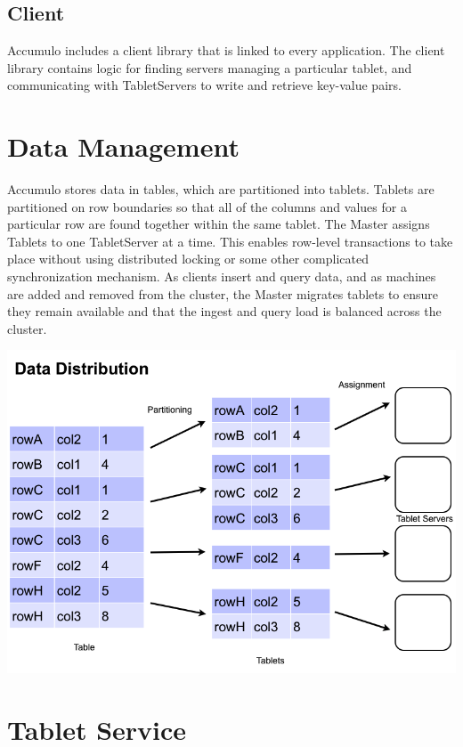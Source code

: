 \subsection{Client}

Accumulo includes a client library that is linked to every application. The client
library contains logic for finding servers managing a particular tablet, and
communicating with TabletServers to write and retrieve key-value pairs.

\section{Data Management}

Accumulo stores data in tables, which are partitioned into tablets. Tablets are
partitioned on row boundaries so that all of the columns and values for a particular
row are found together within the same tablet. The Master assigns Tablets to one
TabletServer at a time. This enables row-level transactions to take place without
using distributed locking or some other complicated synchronization mechanism. As
clients insert and query data, and as machines are added and removed from the
cluster, the Master migrates tablets to ensure they remain available and that the
ingest and query load is balanced across the cluster.

\begin{center}
\includegraphics[scale=0.4]{images/data_distribution.png}
\end{center}

\section{Tablet Service}


